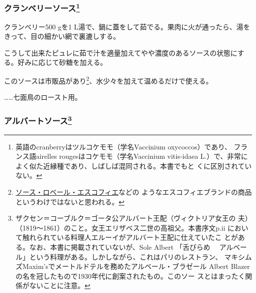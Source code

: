 \begin{recette}
\hypertarget{cranberries-sauce}{%
\subsubsection[クランベリーソース]{\texorpdfstring{クランベリーソース\footnote{英語のcranberryはツルコケモモ（学名Vaccinium
  oxycoccos）であり、 フランス語airelles rougesはコケモモ（学名Vaccinium
  vitis-idaea
  L.）で、非常によく似た近縁種であり、しばしば混同される。本書でもと
  くに区別されていない。}}{クランベリーソース}}\label{cranberries-sauce}}




クランベリー500 gを1
L湯で、鍋に蓋をして茹でる。果肉に火が通ったら、湯をきって、目の細かい網で裏漉しする。

こうして出来たピュレに茹で汁を適量加えてやや濃度のあるソースの状態にする。好みに応じて砂糖を加える。

このソースは市販品があり\footnote{\protect\hyperlink{sauce-robert-escoffier}{ソース・ロベール・エスコフィエ}などの
  ようなエスコフィエブランドの商品というわけではないと思われる。}、水少々を加えて温めるだけで使える。

\ldots{}\ldots{}七面鳥のロースト用。

\maeaki

\hypertarget{albert-sauce}{%
\subsubsection[アルバートソース]{\texorpdfstring{アルバートソース\footnote{ザクセン＝コーブルク＝ゴータ公アルバート王配（ヴィクトリア女王の
  夫）（1819〜1861）のこと。女王エリザベス二世の高祖父。本書序文p.ii
  において触れられている料理人エルーイがアルバート王配に仕えていたこ
  とがある。なお、本書に掲載されていないが、Sole Albert 「舌びらめ　
  アルベール」という料理がある。しかしながら、これはパリのレストラン、
  マキシムズMaxim'sでメートルドテルを務めたアルベール・ブラゼール Albert
  Blazerの名を冠したもので1930年代に創案されたもの。このソー
  スとはまったく関係がないことに注意。}}{アルバートソース}}\label{albert-sauce}}


\end{recette}
